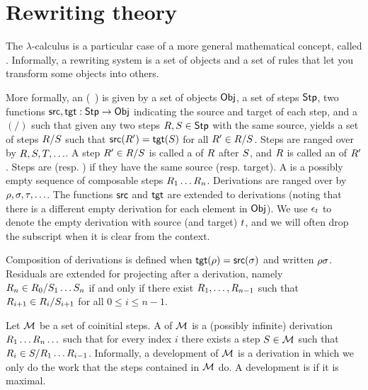 \section{Rewriting theory}
The $\lambda$-calculus is a particular case of a more general mathematical concept, called .
Informally, a rewriting system is a set of objects and a set of rules that let you transform some objects into others.

More formally, an  (\cf~\cite[Def.~2.1]{thesismellies})
is given by a set of objects $\mathsf{Obj}$, a set of steps $\mathsf{Stp}$,
two functions $\mathsf{src},\mathsf{tgt} : \mathsf{Stp} \to \mathsf{Obj}$ indicating the source and target of each step,
and a  $(/)$ such that given any two steps $R,S \in \mathsf{Stp}$
with the same source, yields a set of steps $R/S$ such that $\mathsf{src}(R') = \mathsf{tgt}(S)$
for all $R' \in R/S$.
Steps are ranged over by $R,S,T,\hdots$.
A step $R' \in R/S$ is called a  of $R$ after $S$,
and $R$ is called an  of $R'$.
Steps are  (resp. ) if they have the same source (resp. target).
A  is a possibly empty sequence of composable steps $R_1\hdots R_n$.
Derivations are ranged over by $\rho,\sigma,\tau,\hdots$.
The functions $\mathsf{src}$ and $\mathsf{tgt}$ are extended to derivations (noting that there is a different empty derivation for each element in $\mathsf{Obj}$).
We use $\epsilon_t$ to denote the empty derivation with source (and target) $t$, and we will often drop the subscript when it is clear from the context.

Composition of derivations is defined when $\mathsf{tgt}(\rho) = \mathsf{src}(\sigma)$ and written $\rho\sigma$.
Residuals are extended for projecting after a derivation,
namely $R_n \in R_0/S_1\hdots S_n$
if and only if there exist $R_1,\hdots,R_{n-1}$
such that $R_{i+1} \in R_i/S_{i+1}$ for all $0 \leq i \leq n - 1$.

Let $\mathcal{M}$ be a set of coinitial steps.
A  of $\mathcal{M}$ is a (possibly infinite) derivation $R_1\hdots R_n\hdots$
such that for every index $i$ there exists a step $S \in \mathcal{M}$
such that $R_i \in S/R_1\hdots R_{i-1}$.
Informally, a development of $\mathcal{M}$ is a derivation in which we only
do the work that the steps contained in $\mathcal{M}$ do.
A development is  if it is maximal.

